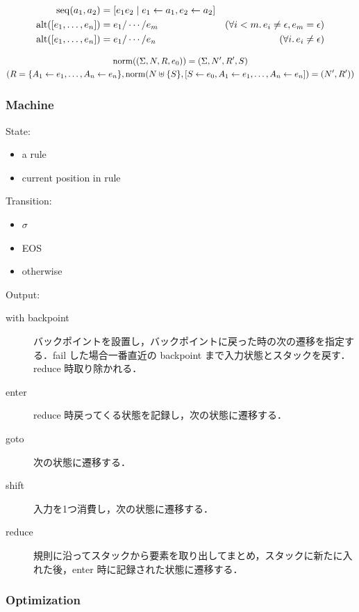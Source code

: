 \begin{align*}
  \mathop{\mathrm{seq}}(a_1, a_2) &= [e_1 e_2 \mid e_1 \gets a_1, e_2 \gets a_2] \\
  \mathop{\mathrm{alt}}([e_1, \ldots, e_n]) &= e_1 / \cdots / e_m &(\forall i < m\ldotp e_i \neq \epsilon, e_m = \epsilon) \\
  \mathop{\mathrm{alt}}([e_1, \ldots, e_n]) &= e_1 / \cdots / e_n &(\forall i\ldotp e_i \neq \epsilon)
\end{align*}

\begin{gather*}
  \mathop{\mathrm{norm}}((\Sigma, N, R, e_0)) = (\Sigma, N', R', S) \\
  (R = \{A_1 \gets e_1, \ldots, A_n \gets e_n\}, \mathop{\mathrm{norm}}(N \uplus \{S\}, [S \gets e_0, A_1 \gets e_1, \ldots, A_n \gets e_n]) = (N', R'))
\end{gather*}

\subsubsection{Machine}

State:
\begin{itemize}
  \item a rule
  \item current position in rule
\end{itemize}

Transition:
\begin{itemize}
  \item $\sigma$
  \item EOS
  \item otherwise
\end{itemize}

Output:
\begin{description}
  \item[with backpoint] バックポイントを設置し，バックポイントに戻った時の次の遷移を指定する．fail した場合一番直近の backpoint まで入力状態とスタックを戻す．reduce 時取り除かれる．
  \item[enter] reduce 時戻ってくる状態を記録し，次の状態に遷移する．
  \item[goto] 次の状態に遷移する．
  \item[shift] 入力を1つ消費し，次の状態に遷移する．
  \item[reduce] 規則に沿ってスタックから要素を取り出してまとめ，スタックに新たに入れた後，enter 時に記録された状態に遷移する．
\end{description}

\subsubsection{Optimization}

